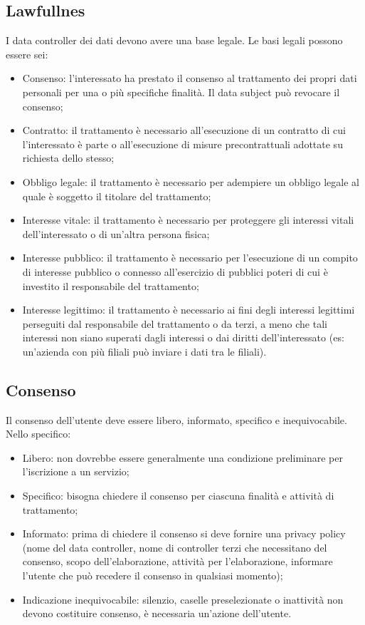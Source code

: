 \subsection{Lawfullnes}
I data controller dei dati devono avere una base legale. Le basi legali possono essere sei:
\begin{itemize}
    \item Consenso: l'interessato ha prestato il consenso al trattamento dei propri dati personali per una o più specifiche finalità. Il data subject può revocare il consenso;
    \item Contratto: il trattamento è necessario all'esecuzione di un contratto di cui l'interessato è parte o all'esecuzione di misure precontrattuali adottate su richiesta dello stesso;
    \item Obbligo legale: il trattamento è necessario per adempiere un obbligo legale al quale è soggetto il titolare del trattamento;
    \item Interesse vitale: il trattamento è necessario per proteggere gli interessi vitali dell'interessato o di un'altra persona fisica;
    \item Interesse pubblico: il trattamento è necessario per l'esecuzione di un compito di interesse pubblico o connesso all'esercizio di pubblici poteri di cui è investito il responsabile del trattamento;
    \item Interesse legittimo: il trattamento è necessario ai fini degli interessi legittimi perseguiti dal responsabile del trattamento o da terzi, a meno che tali interessi non siano superati dagli interessi o dai diritti dell'interessato (es: un'azienda con più filiali può inviare i dati tra le filiali).
\end{itemize}

\subsection{Consenso}
Il consenso dell'utente deve essere libero, informato, specifico e inequivocabile. Nello specifico:
\begin{itemize}
    \item Libero: non dovrebbe essere generalmente una condizione preliminare per l'iscrizione a un servizio;
    \item Specifico: bisogna chiedere il consenso per ciascuna finalità e attività di trattamento;
    \item Informato: prima di chiedere il consenso si deve fornire una privacy policy (nome del data controller, nome di controller terzi che necessitano del consenso, scopo dell'elaborazione, attività per l'elaborazione, informare l'utente che può recedere il consenso in qualsiasi momento);
    \item Indicazione inequivocabile: silenzio, caselle preselezionate o inattività non devono costituire consenso, è necessaria un'azione dell'utente.
\end{itemize}


